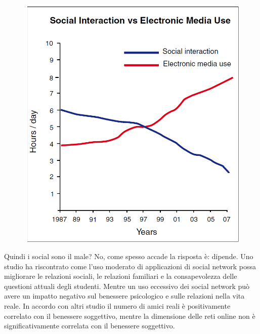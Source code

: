 \documentclass[12pt]{book} %
\begin{document}
\begin{mdframed}[linewidth=1pt]
\needspace{4cm}
\begin{figure}
  \includegraphics[width=0.95\linewidth]{images/Libro-img056.png}
\end{figure}

Quindi i social sono il male? No, come spesso accade la risposta è: dipende. Uno studio ha riscontrato come l'uso moderato di applicazioni di social network possa migliorare le relazioni sociali, le relazioni familiari e la consapevolezza delle questioni attuali degli studenti. Mentre un uso eccessivo dei social network può avere un impatto negativo sul benessere psicologico e sulle relazioni nella vita reale. In accordo con altri studio  il numero di amici reali è positivamente correlato con il benessere soggettivo, mentre la dimensione delle reti online non è significativamente correlata con il benessere soggettivo.


\end{mdframed}
\end{document}
